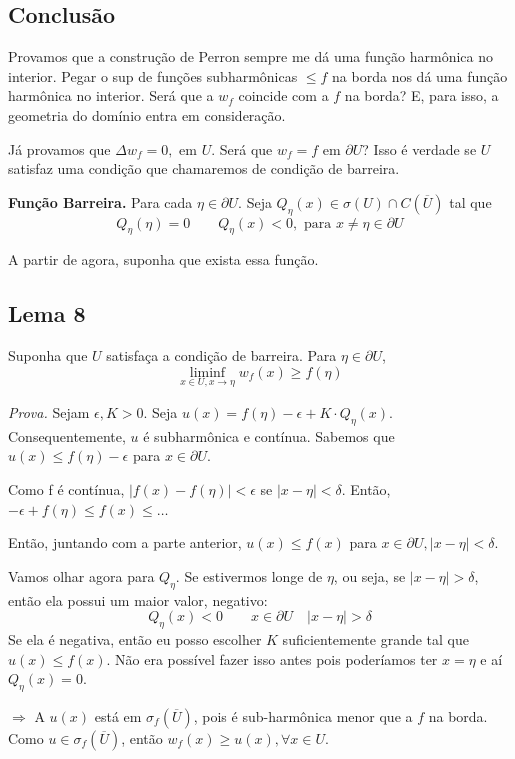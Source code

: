 \documentclass[11pt]{article}
\newcommand{\p}{\partial}
\newcommand{\e}{\epsilon}
\begin{document}
\subsection*{Conclusão}

Provamos que a construção de Perron sempre me dá uma função harmônica no interior. Pegar o sup de funções subharmônicas \(\leq f\) na borda nos dá uma função harmônica no interior. Será que a \(w_f\) coincide com a \(f\) na borda? E, para isso, a geometria do domínio entra em consideração.

Já provamos que \(\Delta w_f = 0, \text{ em } U\). Será que \(w_f = f \text{ em } \p U\)? Isso é verdade se \(U\) satisfaz uma condição que chamaremos de condição de barreira.

\textbf{Função Barreira.} Para cada \(\eta \in \p U\). Seja \(Q_\eta (x) \in \sigma(U) \cap C(\overline{U})\) tal que \[Q_\eta (\eta)=0 \qquad Q_\eta(x)<0, \text{ para } x \neq \eta \in \p U\]

A partir de agora, suponha que exista essa função.

\subsection*{Lema 8}

Suponha que \(U\) satisfaça a condição de barreira.
Para \(\eta \in \p U\), \[\liminf_{x \in U, x \rightarrow \eta} w_f(x) \geq f(\eta)\]


\textit{Prova.} Sejam \(\e, K > 0\). Seja \(u(x) = f(\eta) - \e + K\cdot Q_\eta(x)\). Consequentemente, \(u\) é subharmônica e contínua. Sabemos que \(u(x) \leq f(\eta) - \e\) para \(x \in \p U\).

Como f é contínua, \(|f(x)-f(\eta)|<\e\) se \(|x-\eta|<\delta \). Então, \(-\e + f(\eta) \leq f(x) \leq \ldots \)

Então, juntando com a parte anterior, \(u(x) \leq f(x)\) para \(x \in \p U, |x-\eta|<\delta\).

Vamos olhar agora para \(Q_\eta\). Se estivermos longe de \(\eta\), ou seja, se \(|x-\eta|>\delta\), então ela possui um maior valor, negativo: \[Q_\eta(x) < 0 \qquad x \in \p U \quad |x-\eta|>\delta\]
Se ela é negativa, então eu posso escolher \(K\) suficientemente grande tal que \(u(x) \leq f(x)\). Não era possível fazer isso antes pois poderíamos ter \(x=\eta\) e aí \(Q_\eta(x)=0\).

\(\Longrightarrow\) A \(u(x)\) está em \(\sigma_f(\overline{U})\), pois é sub-harmônica menor que a \(f\) na borda. Como \(u \in \sigma_f(\overline{U})\), então \(w_f(x) \geq u(x), \forall x \in U\).
\end{document}
